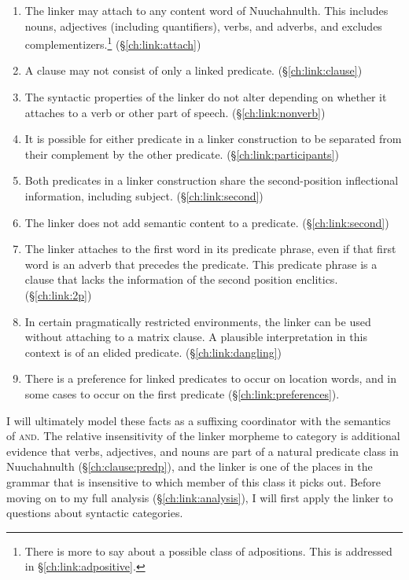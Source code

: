 \begin{enumerate}[nolistsep]
	\item The linker may attach to any content word of Nuuchahnulth. This includes nouns, adjectives (including quantifiers), verbs, and adverbs, and excludes complementizers.\footnote{There is more to say about a possible class of adpositions. This is addressed in \S\ref{ch:link:adpositive}.} (\S\ref{ch:link:attach})
	\item A clause may not consist of only a linked predicate. (\S\ref{ch:link:clause})
	\item The syntactic properties of the linker do not alter depending on whether it attaches to a verb or other part of speech. (\S\ref{ch:link:nonverb})
	\item It is possible for either predicate in a linker construction to be separated from their complement by the other predicate. (\S\ref{ch:link:participants})
	\item Both predicates in a linker construction share the second-position inflectional information, including subject. (\S\ref{ch:link:second})
	\item The linker does not add semantic content to a predicate. (\S\ref{ch:link:second})
	\item The linker attaches to the first word in its predicate phrase, even if that first word is an adverb that precedes the predicate. This predicate phrase is a clause that lacks the information of the second position enclitics. (\S\ref{ch:link:2p})
	\item In certain pragmatically restricted environments, the linker can be used without attaching to a matrix clause. A plausible interpretation in this context is of an elided predicate. (\S\ref{ch:link:dangling})
	\item There is a preference for linked predicates to occur on location words, and in some cases to occur on the first predicate (\S\ref{ch:link:preferences}).
\end{enumerate}

I will ultimately model these facts as a suffixing coordinator with the semantics of \textsc{and}. The relative insensitivity of the linker morpheme to category is additional evidence that verbs, adjectives, and nouns are part of a natural predicate class in Nuuchahnulth (\S\ref{ch:clause:predp}), and the linker is one of the places in the grammar that is insensitive to which member of this class it picks out. Before moving on to my full analysis (\S\ref{ch:link:analysis}), I will first apply the linker to questions about syntactic categories.

